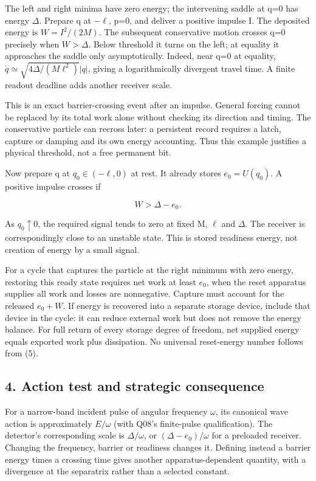 \documentclass[11pt,a4paper]{article}
\begin{document}
The left and right minima have zero energy; the intervening saddle at
q=0 has energy \(\Delta\). Prepare q at \(-\ell\), p=0, and deliver a
positive impulse I. The deposited energy is \(W=I^2/(2M)\). The
subsequent conservative motion crosses q=0 precisely when \(W>\Delta\).
Below threshold it turns on the left; at equality it approaches the
saddle only asymptotically. Indeed, near q=0 at equality,
\(\dot q\simeq\sqrt{4\Delta/(M\ell^2)}|q|\), giving a logarithmically
divergent travel time. A finite readout deadline adds another receiver
scale.

This is an exact barrier-crossing event after an impulse. General
forcing cannot be replaced by its total work alone without checking its
direction and timing. The conservative particle can recross later: a
persistent record requires a latch, capture or damping and its own
energy accounting. Thus this example justifies a physical threshold, not
a free permanent bit.

Now prepare q at \(q_0\in(-\ell,0)\) at rest. It already stores
\(e_0=U(q_0)\). A positive impulse crosses if

\[W>\Delta-e_0. \tag{6}\]

As \(q_0\uparrow0\), the required signal tends to zero at fixed M,
\(\ell\) and \(\Delta\). The receiver is correspondingly close to an
unstable state. This is stored readiness energy, not creation of energy
by a small signal.

For a cycle that captures the particle at the right minimum with zero
energy, restoring this ready state requires net work at least \(e_0\),
when the reset apparatus supplies all work and losses are nonnegative.
Capture must account for the released \(e_0+W\). If energy is recovered
into a separate storage device, include that device in the cycle: it can
reduce external work but does not remove the energy balance. For full
return of every storage degree of freedom, net supplied energy equals
exported work plus dissipation. No universal reset-energy number follows
from (5).

\hypertarget{action-test-and-strategic-consequence}{%
\subsection{4. Action test and strategic
consequence}\label{action-test-and-strategic-consequence}}

For a narrow-band incident pulse of angular frequency \(\omega\), its
canonical wave action is approximately \(E/\omega\) (with Q08's
finite-pulse qualification). The detector's corresponding scale is
\(\Delta/\omega\), or \((\Delta-e_0)/\omega\) for a preloaded receiver.
Changing the frequency, barrier or readiness changes it. Defining
instead a barrier energy times a crossing time gives another
apparatus-dependent quantity, with a divergence at the separatrix rather
than a selected constant.
\end{document}
